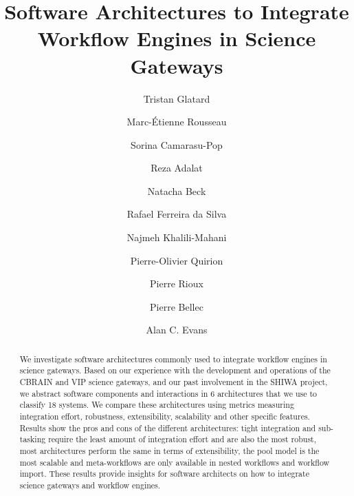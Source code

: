 \documentclass[preprint,3p,twocolumn]{elsarticle}
\begin{document}
\begin{frontmatter}



\title{Software Architectures to Integrate Workflow Engines in Science Gateways}


\author[mcgill,creatis]{Tristan Glatard}
\author[mcgill]{Marc-\'Etienne Rousseau}
\author[creatis]{Sorina Camarasu-Pop}

\author[mcgill]{Reza Adalat}
\author[mcgill]{Natacha Beck}
\author[isi]{Rafael Ferreira da Silva}
\author[mcgill]{Najmeh Khalili-Mahani}
\author[criugm]{Pierre-Olivier Quirion}
\author[mcgill]{Pierre Rioux}

\author[criugm]{Pierre Bellec}
\author[mcgill]{Alan C. Evans}

\address[mcgill]{McGill Centre for Integrative Neuroscience, Montreal Neurological Institute, McGill University, Canada.}
\address[creatis]{University of Lyon, CNRS, INSERM, CREATIS, Villeurbanne, France.}
\address[criugm]{Centre de Recherche de l'Institut de G\'eriatrie de Montr\'eal CRIUGM, Montreal, QC, Canada.}
\address[isi]{University of Southern California, Information Sciences Institute, Marina del Rey, CA, USA.}

\begin{abstract}
  We investigate software architectures commonly used to integrate workflow engines
  in science gateways. Based on our experience with the development
  and operations of the CBRAIN and VIP science gateways, and our past
  involvement in the SHIWA project, we abstract software components
  and interactions in 6 architectures that we use to classify 18
  systems. We compare these architectures using metrics measuring
  integration effort, robustness, extensibility, scalability and other
  specific features. Results show the pros and cons of the different
  architectures: tight integration and sub-tasking require the least
  amount of integration effort and are also the most robust, most
  architectures perform the same in terms of extensibility, the pool
  model is the most scalable and meta-workflows are only available in
  nested workflows and workflow import. These results provide insights
  for software architects on how to integrate science gateways and
  workflow engines.
\end{abstract}


\end{frontmatter}
\end{document}

